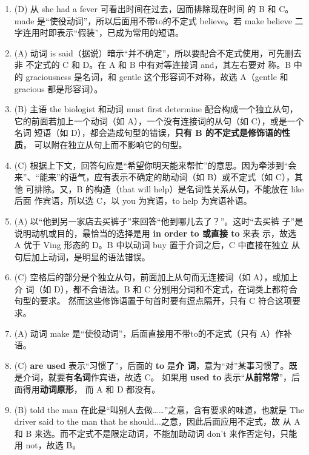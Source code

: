 \begin{enumerate}
\item (D) 从 she had a fever 可看出时间在过去，因而排除现在时间
  的 B 和 C。made 是“使役动词”，所以后面用不带to的不定式 believe。若 make
  believe 二字连用时即表示“假装”，已成为常用的短语。

\item (A) 动词 is said（据说）暗示“并不确定”，所以要配合不定式使用，可先删去非
  不定式的 C 和 D。在 A 和 B 中有对等连接词 and，其左右要对
  称。B 中的 graciousness 是名词，和 gentle 这个形容词不对称，故选 A（gentle
  和 gracious 都是形容词）。

\item (B) 主语 the biologist 和动词 must first determine 配合构成一个独立从句，
  它的前面若加上一个动词（如 A），一个没有连接词的从句（如 C），或是一个名词
  短语（如 D），都会造成句型的错误，\textbf{只有 B 的不定式是修饰语的性质}，
  可以附在独立从句上而不影响它的句型。

\item (C) 根据上下文，回答句应是“希望你明天能来帮忙”的意思。因为牵涉到“会
  来”、“能来”的语气，应有表示不确定的助动词（如 B）或不定式（如 C），其他
  可排除。又，B 的构造（that will help）是名词性关系从句，不能放在 like 后面
  作宾语，所以选 C，以 you 为宾语，to help 为宾语补语。

\item (A) 以“他到另一家店去买裤子”来回答“他到哪儿去了？”。这时“去买裤
  子”是说明动机或目的，最恰当的选择是用 \textbf{in order to 或直接 to} 来表
  示，故选 A 优于 Ving 形态的 D。B 中以动词 buy 置于介词之后，C 中直接在独立
  从句后加上动词，是明显的语法错误。


\item (C) 空格后的部分是个独立从句，前面加上从句而无连接词（如 A），或加上介
  词（如 D），都不合语法。B 和 C 分别用分词和不定式，在词类上都符合句型的要求。
  然而这些修饰语置于句首时要有逗点隔开，只有 C 符合这项要求。

\item (A) 动词 make 是“使役动词”，后面直接用不带to的不定式（只有 A）作补语。

\item (C) \textbf{are used} 表示“习惯了”，后面的 \textbf{to} 是\textbf{介
    词}，意为“对”某事习惯了。既是介词，就要有\textbf{名词}作宾语，故选 C。
  如果用 \textbf{used to} 表示“\textbf{从前常常}”，后面得用\textbf{动词原形}，
  而 A 和 D 都没有。

\item (B) told the man 在此是“叫别人去做……”之意，含有要求的味道，也就是 The
  driver said to the man that he should...之意，因此后面应用不定式，故
  从 A 和 B 来选。而不定式不是限定动词，不能加助动词 don’t 来作否定句，只能
  用 not，故选 B。


\end{enumerate}
